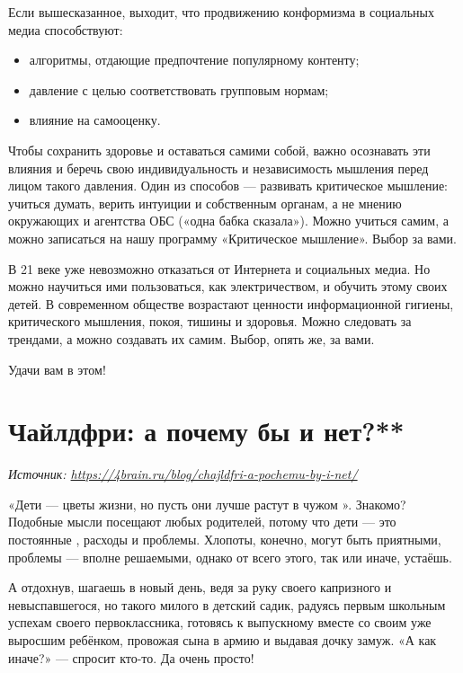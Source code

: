 Если  вышесказанное, выходит, что продвижению конформизма в социальных медиа способствуют:
\begin{itemize}[noitemsep, label=--]
    \item алгоритмы, отдающие предпочтение популярному контенту;
    \item давление с целью соответствовать групповым нормам;
    \item влияние на самооценку.
\end{itemize}
Чтобы сохранить здоровье и оставаться самими собой, важно осознавать эти влияния и беречь свою индивидуальность и независимость мышления перед лицом такого давления. Один из способов --- развивать критическое мышление: учиться думать, верить интуиции и собственным органам, а не мнению окружающих и агентства ОБС («одна бабка сказала»). Можно учиться самим, а можно записаться на нашу программу «Критическое мышление». Выбор за вами.

В 21 веке уже невозможно отказаться от Интернета и социальных медиа. Но можно научиться ими пользоваться, как электричеством, и обучить этому своих детей. В современном обществе возрастают ценности информационной гигиены, критического мышления, покоя, тишины и здоровья. Можно следовать за трендами, а можно создавать их самим. Выбор, опять же, за вами.

Удачи вам в этом!

\clearpage

\section{Чайлдфри: а почему бы и нет?**}

\textit{Источник: \url{https://4brain.ru/blog/chajldfri-a-pochemu-by-i-net/}}

«Дети --- цветы жизни, но пусть они лучше растут в чужом ». Знакомо? Подобные мысли посещают  любых родителей, потому что дети --- это постоянные , расходы и проблемы. Хлопоты, конечно, могут быть приятными, проблемы --- вполне решаемыми, однако от всего этого, так или иначе, устаёшь.

А отдохнув, шагаешь в новый день, ведя за руку своего капризного и невыспавшегося, но такого милого  в детский садик, радуясь первым школьным успехам своего первоклассника, готовясь к выпускному вместе со своим уже выросшим ребёнком, провожая сына в армию и выдавая дочку замуж. «А как иначе?» --- спросит кто-то. Да очень просто!

